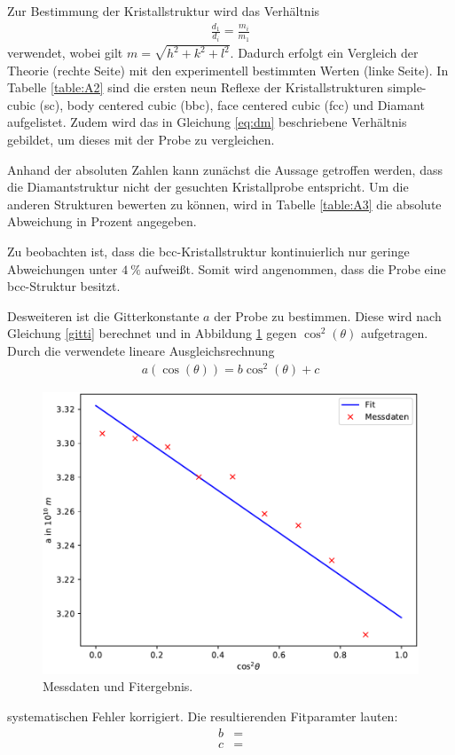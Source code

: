 Zur Bestimmung der Kristallstruktur wird das Verhältnis
\begin{align}
	\frac{d_1}{d_i}=\frac{m_i}{m_1}
	\label{eq:dm}
\end{align}
verwendet, wobei gilt $m=\sqrt{h^2+k^2+l^2}$. Dadurch erfolgt ein Vergleich der Theorie (rechte Seite) mit den experimentell bestimmten Werten (linke Seite).
In Tabelle \ref{table:A2} sind die ersten neun Reflexe der Kristallstrukturen simple-cubic (sc), body centered cubic (bbc), face centered cubic (fcc) und Diamant aufgelistet. Zudem wird das in Gleichung \ref{eq:dm} beschriebene Verhältnis gebildet, um dieses mit der Probe zu vergleichen.



Anhand der absoluten Zahlen kann zunächst die Aussage getroffen werden, dass die Diamantstruktur nicht der gesuchten Kristallprobe entspricht. Um die anderen Strukturen bewerten zu können, wird in Tabelle \ref{table:A3} die absolute Abweichung in Prozent angegeben.



Zu beobachten ist, dass die bcc-Kristallstruktur kontinuierlich nur geringe Abweichungen unter $\SI{4}{\percent}$ aufweißt. Somit wird angenommen, dass die Probe eine bcc-Struktur besitzt.

Desweiteren ist die Gitterkonstante $a$ der Probe zu bestimmen. Diese wird nach Gleichung \eqref{gitti} berechnet und in Abbildung \ref{fig:plot1} gegen $\cos^2{(\theta)}$ aufgetragen. Durch die verwendete lineare Ausgleichsrechnung
\begin{align}
	a(\cos{(\theta)})= b\cos^2{(\theta)} + c
	\label{eq:FIT}
\end{align}

\begin{figure}
  \centering
  \includegraphics[scale=0.75]{build/Metall.pdf}
  \caption{Messdaten und Fitergebnis.}
  \label{fig:plot1}
\end{figure}
systematischen Fehler korrigiert. Die resultierenden Fitparamter lauten:
\begin{align}
	b&=  \\
	c&= 
\end{align}

